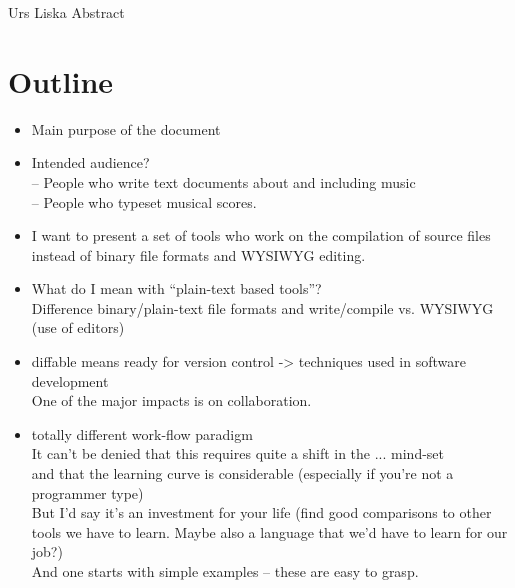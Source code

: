 \documentclass[../../LilyPond-Tutorials]{subfiles}
\begin{document}
\begin{authorAbstract}{Urs Liska}
Abstract
\end{authorAbstract}

\chapter{Outline}

\begin{itemize}
\item Main purpose of the document
\item Intended audience?\\
-- People who write text documents about and including music\\
-- People who typeset musical scores.
\item I want to present a set of tools who work on the compilation of source files instead of binary file formats and WYSIWYG editing.
\item What do I mean with “plain-text based tools”?\\
Difference binary/plain-text file formats and write/compile vs. WYSIWYG (use of editors)
\item diffable means ready for version control -> techniques used in software development\\
One of the major impacts is on collaboration.
\item totally different work-flow paradigm\\
It can't be denied that this requires quite a shift in the ... mind-set\\
and that the learning curve is considerable (especially if you're not a programmer type)\\
But I'd say it's an investment for your life (find good comparisons to other tools we have to learn. Maybe also a language that we'd have to learn for our job?)\\
And one starts with simple examples -- these are easy to grasp.


\end{itemize}
\end{document}
